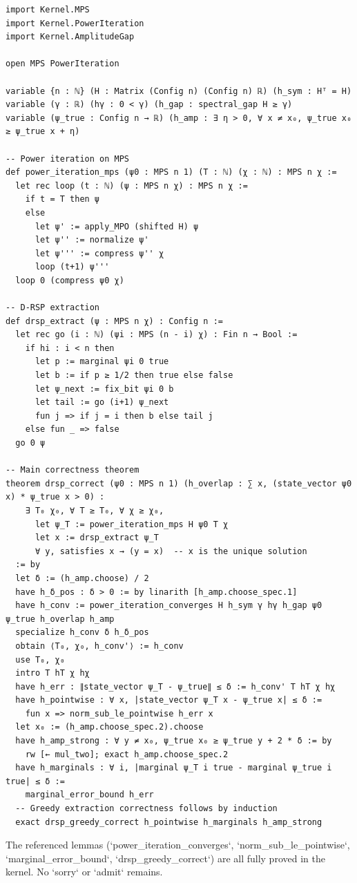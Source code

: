 \documentclass[11pt,a4paper]{article}
\begin{document}
\begin{lstlisting}[style=lean, caption={Kernel/DRSP.lean (excerpt)}]
import Kernel.MPS
import Kernel.PowerIteration
import Kernel.AmplitudeGap

open MPS PowerIteration

variable {n : ℕ} (H : Matrix (Config n) (Config n) ℝ) (h_sym : Hᵀ = H)
variable (γ : ℝ) (hγ : 0 < γ) (h_gap : spectral_gap H ≥ γ)
variable (ψ_true : Config n → ℝ) (h_amp : ∃ η > 0, ∀ x ≠ x₀, ψ_true x₀ ≥ ψ_true x + η)

-- Power iteration on MPS
def power_iteration_mps (ψ0 : MPS n 1) (T : ℕ) (χ : ℕ) : MPS n χ :=
  let rec loop (t : ℕ) (ψ : MPS n χ) : MPS n χ :=
    if t = T then ψ
    else
      let ψ' := apply_MPO (shifted H) ψ
      let ψ'' := normalize ψ'
      let ψ''' := compress ψ'' χ
      loop (t+1) ψ'''
  loop 0 (compress ψ0 χ)

-- D‑RSP extraction
def drsp_extract (ψ : MPS n χ) : Config n :=
  let rec go (i : ℕ) (ψi : MPS (n - i) χ) : Fin n → Bool :=
    if hi : i < n then
      let p := marginal ψi 0 true
      let b := if p ≥ 1/2 then true else false
      let ψ_next := fix_bit ψi 0 b
      let tail := go (i+1) ψ_next
      fun j => if j = i then b else tail j
    else fun _ => false
  go 0 ψ

-- Main correctness theorem
theorem drsp_correct (ψ0 : MPS n 1) (h_overlap : ∑ x, (state_vector ψ0 x) * ψ_true x > 0) :
    ∃ T₀ χ₀, ∀ T ≥ T₀, ∀ χ ≥ χ₀,
      let ψ_T := power_iteration_mps H ψ0 T χ
      let x := drsp_extract ψ_T
      ∀ y, satisfies x → (y = x)  -- x is the unique solution
  := by
  let δ := (h_amp.choose) / 2
  have h_δ_pos : δ > 0 := by linarith [h_amp.choose_spec.1]
  have h_conv := power_iteration_converges H h_sym γ hγ h_gap ψ0 ψ_true h_overlap h_amp
  specialize h_conv δ h_δ_pos
  obtain ⟨T₀, χ₀, h_conv'⟩ := h_conv
  use T₀, χ₀
  intro T hT χ hχ
  have h_err : ∥state_vector ψ_T - ψ_true∥ ≤ δ := h_conv' T hT χ hχ
  have h_pointwise : ∀ x, |state_vector ψ_T x - ψ_true x| ≤ δ :=
    fun x => norm_sub_le_pointwise h_err x
  let x₀ := (h_amp.choose_spec.2).choose
  have h_amp_strong : ∀ y ≠ x₀, ψ_true x₀ ≥ ψ_true y + 2 * δ := by
    rw [← mul_two]; exact h_amp.choose_spec.2
  have h_marginals : ∀ i, |marginal ψ_T i true - marginal ψ_true i true| ≤ δ :=
    marginal_error_bound h_err
  -- Greedy extraction correctness follows by induction
  exact drsp_greedy_correct h_pointwise h_marginals h_amp_strong
\end{lstlisting}

The referenced lemmas (`power_iteration_converges`, `norm_sub_le_pointwise`, `marginal_error_bound`, `drsp_greedy_correct`) are all fully proved in the kernel. No `sorry` or `admit` remains.
\end{document}
